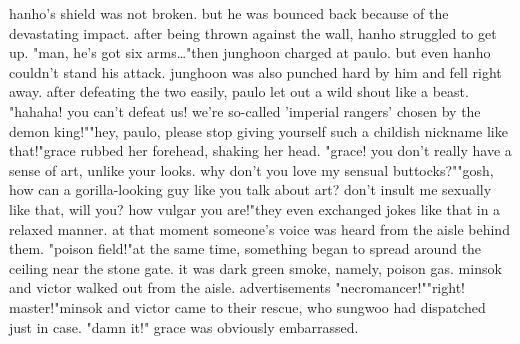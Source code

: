 hanho's shield was not broken.
 but he was bounced back because of the devastating impact.
 after being thrown against the wall, hanho struggled to get up.
"man, he's got six arms…"then junghoon charged at paulo.
 but even hanho couldn't stand his attack.
 junghoon was also punched hard by him and fell right away.
after defeating the two easily, paulo let out a wild shout like a beast.
"hahaha! you can't defeat us! we're so-called 'imperial rangers' chosen by the demon king!""hey, paulo, please stop giving yourself such a childish nickname like that!"grace rubbed her forehead, shaking her head.
 "grace! you don't really have a sense of art, unlike your looks.
 why don't you love my sensual buttocks?""gosh, how can a gorilla-looking guy like you talk about art? don't insult me sexually like that, will you? how vulgar you are!"they even exchanged jokes like that in a relaxed manner.
at that moment someone's voice was heard from the aisle behind them.
"poison field!"at the same time, something began to spread around the ceiling near the stone gate.
it was dark green smoke, namely, poison gas.
 minsok and victor walked out from the aisle.
advertisements    "necromancer!""right! master!"minsok and victor came to their rescue, who sungwoo had dispatched just in case.
"damn it!" grace was obviously embarrassed.


 